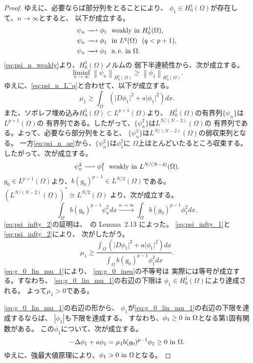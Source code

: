 \begin{proof}
 ゆえに、必要ならば部分列をとることにより、
 $\phi_1 \in H_0^1(\Omega)$が存在して、$n \to \infty$とすると、
 以下が成立する。
 \begin{align}
  \psi_n \xrightharpoonup{ \mbox{ ~ } } \phi_1 & \ \ \text{weakly~} \tin
  H_0^1(\Omega), \label{eq:psi_n_weakly} \\
  \psi_n \xrightarrow{ \mbox{ ~ } } \phi_1 & \ \ \tin L^q(\Omega) \ \
   (q < p+1), \label{eq:psi_n_L^q} \\
  \psi_n \xrightarrow{ \mbox{ ~ } } \phi_1 & \ \ \ae \tin \Omega. 
    \label{eq:psi_n_ae} 
 \end{align}
 \eqref{eq:psi_n_weakly}より、$H_0^1(\Omega)$ノルムの
 弱下半連続性から、次が成立する。
 \[
  \liminf_{n \to \infty} \left\| \psi_n \right\|_{H_0^1(\Omega)}
 \geq \left\| \phi_1 \right\|_{H_0^1(\Omega)}.
 \]
 ゆえに、\eqref{eq:psi_n_L^q}と合わせて、以下が成立する。
 \begin{equation}
  \mu_1 \geq \int_\Omega \left( \lvert D\phi_1 \rvert^2 + a \lvert
                          \phi_1 \rvert^2
                         \right) dx. \label{eq:psi_infty_1}
 \end{equation}
 また、ソボレフ埋め込み$H_0^1(\Omega) \subset L^{p+1}(\Omega)$より、
 $H_0^1(\Omega)$の有界列$\{ \psi_n \}$は$L^{p+1}(\Omega)$の
 有界列である。したがって、$\{ \psi_n^2 \}$は$L^{N/(N-2)}(\Omega)$の
 有界列である。よって、必要なら部分列をとると、
 $\{\psi_n^2 \}$は$L^{N/(N-2)}(\Omega)$の弱収束列となる。
 一方\eqref{eq:psi_n_ae}から、$\{ \psi_n^2 \}$は$\phi_1^2$に
 $\Omega$上ほとんどいたるところ収束する。したがって、次が成立する。
 \[
 \psi_n^2 \xrightharpoonup{ \mbox{ ~ } } \phi_1^2 \ \ \text{weakly~} \tin
 L^{N/(N-2)}(\Omega).
 \]
 $g_0 \in L^{p+1}(\Omega)$より、$b (g_0)^{p-1} \in
 L^{N/2} (\Omega)$である。$\left(L^{N/(N-2)}(\Omega)\right)^*
 \cong L^{N/2}(\Omega)$
 より、次が成立する。
 \begin{equation}
  \int_\Omega b(g_0)^{p-1} \psi_n^2 dx \xrightarrow{n \to \infty}
   \int_{\Omega} b(g_0)^{p-1} \phi_1^2 dx. \label{eq:psi_infty_2}
 \end{equation}
 \eqref{eq:psi_infty_2}の証明は、\cite{MR1400007}~の Lemma~2.13 によった。
 \eqref{eq:psi_infty_1}と\eqref{eq:psi_infty_2}により、
 次がしたがう。
 \begin{equation}
  \mu_1 \geq \frac{\displaystyle \int_\Omega 
   \left( \lvert D\phi_1 \rvert^2 + a \lvert \phi_1 \rvert^2
   \right) dx}{\displaystyle \int_{\Omega} b(g_0)^{p-1} 
   \phi_1^2 dx}. \label{eq:g_0_ineq}
 \end{equation}
 \eqref{eq:g_0_lin_mu_1}により、
 \eqref{eq:g_0_ineq}の不等号は
 実際には等号が成立する。すなわち、
 \eqref{eq:g_0_lin_mu_1}の右辺の下限は
 $\phi_1 \in H_0^1(\Omega)$により達成される。
 よって$\mu_1 > 0$である。
 
 \eqref{eq:g_0_lin_mu_1}の右辺の形から、
 $\phi_1$が\eqref{eq:g_0_lin_mu_1}の右辺の下限を達成するならば、
 $\left| \phi_1 \right|$も下限を達成する。
 すなわち、$\phi_1 \geq 0 ~\text{in}~ \Omega$となる第$1$固有関数がある。
 この$\phi_1$について、次が成立する。
 \[
  - \Delta \phi_1 + a \phi_1 = \mu_1 b (g_0)^{p-1} 
 \phi_1 \geq 0 ~\text{in}~ \Omega.
 \]
 ゆえに、強最大値原理により、$\phi_1 > 0 ~\text{in}~ \Omega$となる。
 \qedhere
\end{proof}

